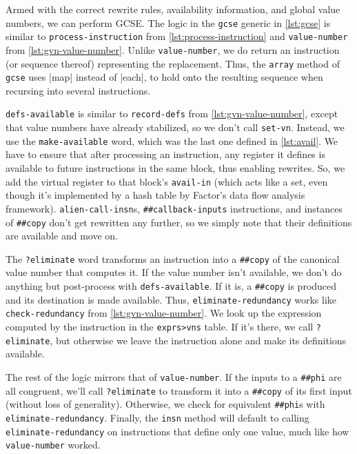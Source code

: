 Armed with the correct rewrite rules, availability information, and global
value numbers, we can perform \gls{GCSE}.  The logic in the \Verb|gcse| generic
in \vref{lst:gcse} is similar to \Verb|process-instruction| from
\vref{lst:process-instruction} and \Verb|value-number| from
\vref{lst:gvn-value-number}.  Unlike \Verb|value-number|, we do return an
instruction (or sequence thereof) representing the replacement.  Thus, the
\Verb|array| method of \Verb|gcse| uses \factor|map| instead of \factor|each|,
to hold onto the resulting sequence when recursing into several instructions.


\Verb|defs-available| is similar to \Verb|record-defs| from
\vref{lst:gvn-value-number}, except that value numbers have already stabilized,
so we don't call \Verb|set-vn|.  Instead, we use the \Verb|make-available|
word, which was the last one defined in \vref{lst:avail}.  We have to ensure
that after processing an instruction, any register it defines is available to
future instructions in the same block, thus enabling rewrites.  So, we add
the virtual register to that block's \Verb|avail-in| (which acts like a set,
even though it's implemented by a hash table by Factor's data flow analysis
framework).  \Verb|alien-call-insn|s, \Verb|##callback-inputs| instructions,
and instances of \Verb|##copy| don't get rewritten any further, so we simply
note that their definitions are available and move on.

The \Verb|?eliminate| word transforms an instruction into a \Verb|##copy|
of the canonical value number that computes it.  If the value number isn't
available, we don't do anything but post-process with \Verb|defs-available|.
If it is, a \Verb|##copy| is produced and its destination is made available.
Thus, \Verb|eliminate-redundancy| works like \Verb|check-redundancy| from
\vref{lst:gvn-value-number}.  We look up the expression computed by the
instruction in the \Verb|exprs>vns| table.  If it's there, we call
\Verb|?eliminate|, but otherwise we leave the instruction alone and make its
definitions available.

The rest of the logic mirrors that of \Verb|value-number|.  If the inputs to a
\Verb|##phi| are all congruent, we'll call \Verb|?eliminate| to transform it
into a \Verb|##copy| of its first input (without loss of generality).
Otherwise, we check for equivalent \Verb|##phi|s with
\Verb|eliminate-redundancy|.  Finally, the \Verb|insn| method will default to
calling \Verb|eliminate-redundancy| on instructions that define only one value,
much like how \Verb|value-number| worked.

